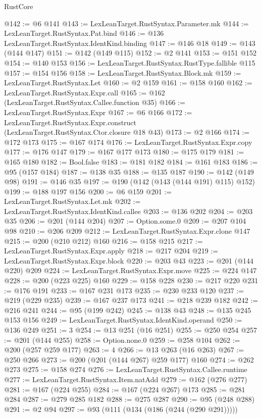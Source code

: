 \begin{lexlean}{RustCore}
\begin{coremodule}
@142 := @6 @141
@143 := LexLeanTarget.RustSyntax.Parameter.mk
@144 := LexLeanTarget.RustSyntax.Pat.bind
@146 := @136 LexLeanTarget.RustSyntax.IdentKind.binding
@147 := @146 @18
@149 := @143 (@144 @147)
@151 := @142 (@149 @115)
@152 := @2 @141
@153 := @151 @152
@154 := @140 @153
@156 := LexLeanTarget.RustSyntax.RustType.fallible @115
@157 := @154 @156
@158 := LexLeanTarget.RustSyntax.Block.mk
@159 := LexLeanTarget.RustSyntax.Let
@160 := @2 @159
@161 := @158 @160
@162 := LexLeanTarget.RustSyntax.Expr.call
@165 := @162 (LexLeanTarget.RustSyntax.Callee.function @35)
@166 := LexLeanTarget.RustSyntax.Expr
@167 := @6 @166
@172 := LexLeanTarget.RustSyntax.Expr.construct (LexLeanTarget.RustSyntax.Ctor.closure @18 @43)
@173 := @2 @166
@174 := @172 @173
@175 := @167 @174
@176 := LexLeanTarget.RustSyntax.Expr.copy
@177 := @176 @147
@179 := @167 @177 @173
@180 := @175 @179
@181 := @165 @180
@182 := Bool.false
@183 := @181 @182
@184 := @161 @183
@186 := @95 (@157 @184)
@187 := @138 @35
@188 := @135 @187
@190 := @142 (@149 @98)
@191 := @146 @35
@197 := @190 (@142 (@143 (@144 @191) @115) @152)
@199 := @188 @197 @156
@200 := @6 @159
@201 := LexLeanTarget.RustSyntax.Let.mk
@202 := LexLeanTarget.RustSyntax.IdentKind.callee
@203 := @136 @202
@204 := @203 @35
@206 := @201 (@144 @204)
@207 := Option.some.{0}
@209 := @207 @104 @98
@210 := @206 @209
@212 := LexLeanTarget.RustSyntax.Expr.clone @147
@215 := @200 (@210 @212) @160
@216 := @158 @215
@217 := LexLeanTarget.RustSyntax.Expr.apply
@218 := @217 @204
@219 := LexLeanTarget.RustSyntax.Expr.block
@220 := @203 @43
@223 := @201 (@144 @220) @209
@224 := LexLeanTarget.RustSyntax.Expr.move
@225 := @224 @147
@228 := @200 (@223 @225) @160
@229 := @158 @228
@230 := @217 @220
@231 := @176 @191
@233 := @167 @231 @173
@235 := @230 @233 @120
@237 := @219 (@229 @235)
@239 := @167 @237 @173
@241 := @218 @239 @182
@242 := @216 @241
@244 := @95 (@199 @242)
@245 := @138 @43
@248 := @135 @245 @153 @156
@249 := LexLeanTarget.RustSyntax.IdentKind.operand
@250 := @136 @249
@251 := 3
@254 := @13 @251 (@16 @251)
@255 := @250 @254
@257 := @201 (@144 @255)
@258 := Option.none.{0}
@259 := @258 @104
@262 := @200 (@257 @259 @177)
@263 := 4
@266 := @13 @263 (@16 @263)
@267 := @250 @266
@273 := @200 (@201 (@144 @267) @259 @177) @160
@274 := @262 @273
@275 := @158 @274
@276 := LexLeanTarget.RustSyntax.Callee.runtime
@277 := LexLeanTarget.RustSyntax.Item.natAdd
@279 := @162 (@276 @277)
@281 := @167 (@224 @255)
@284 := @167 (@224 @267) @173
@285 := @281 @284
@287 := @279 @285 @182
@288 := @275 @287
@290 := @95 (@248 @288)
@291 := @2 @94
@297 := @93 (@111 (@134 (@186 (@244 (@290 @291)))))

\end{coremodule}
\end{lexlean}
